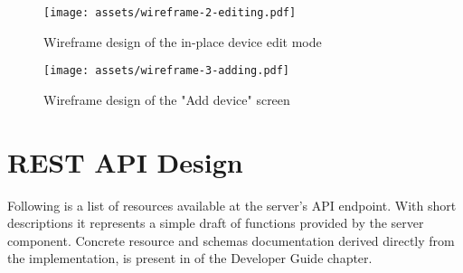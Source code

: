 \begin{figure}[h]{}
\centering\texttt{[image: assets/wireframe-2-editing.pdf]}
\caption{Wireframe design of the in-place device edit mode}
\end{figure}

\begin{figure}[h]{}
\centering\texttt{[image: assets/wireframe-3-adding.pdf]}
\caption{Wireframe design of the "Add device" screen}
\end{figure}

\hypertarget{x-rest-api-design}{\section{REST API Design}}
Following is a list of resources available at the server’s API endpoint.
With short descriptions it represents a simple draft of functions provided 
by the server component.
Concrete resource and schemas documentation derived
directly from the implementation, is present
in \hyperlink{./13-developer-guide#server-api}{} of the
Developer Guide chapter.

